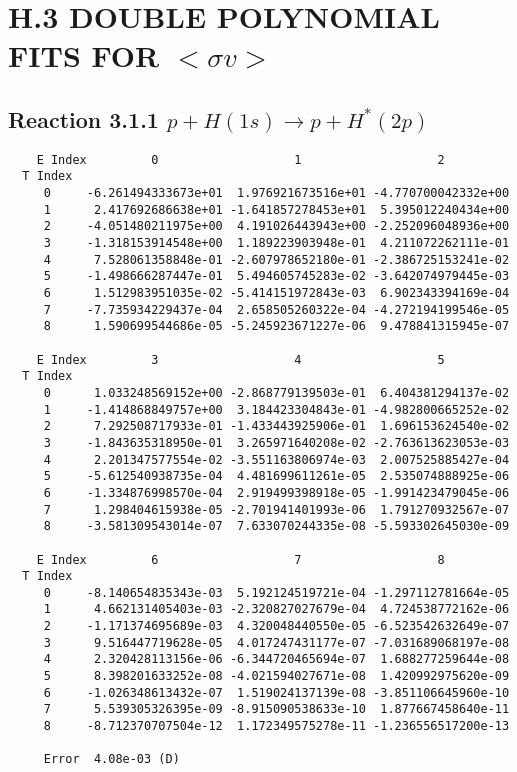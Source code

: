\documentclass[12pt]{article}
\begin{document}
                               

\newpage
\section{
H.3   DOUBLE POLYNOMIAL FITS FOR $<\sigma v>$}

\subsection{
Reaction 3.1.1 $ p + H(1s) \rightarrow p + H^*(2p)$}


\begin{small}\begin{verbatim}
    E Index         0                   1                   2
  T Index
     0     -6.261494333673e+01  1.976921673516e+01 -4.770700042332e+00
     1      2.417692686638e+01 -1.641857278453e+01  5.395012240434e+00
     2     -4.051480211975e+00  4.191026443943e+00 -2.252096048936e+00
     3     -1.318153914548e+00  1.189223903948e-01  4.211072262111e-01
     4      7.528061358848e-01 -2.607978652180e-01 -2.386725153241e-02
     5     -1.498666287447e-01  5.494605745283e-02 -3.642074979445e-03
     6      1.512983951035e-02 -5.414151972843e-03  6.902343394169e-04
     7     -7.735934229437e-04  2.658505260322e-04 -4.272194199546e-05
     8      1.590699544686e-05 -5.245923671227e-06  9.478841315945e-07

    E Index         3                   4                   5
  T Index
     0      1.033248569152e+00 -2.868779139503e-01  6.404381294137e-02
     1     -1.414868849757e+00  3.184423304843e-01 -4.982800665252e-02
     2      7.292508717933e-01 -1.433443925906e-01  1.696153624540e-02
     3     -1.843635318950e-01  3.265971640208e-02 -2.763613623053e-03
     4      2.201347577554e-02 -3.551163806974e-03  2.007525885427e-04
     5     -5.612540938735e-04  4.481699611261e-05  2.535074888925e-06
     6     -1.334876998570e-04  2.919499398918e-05 -1.991423479045e-06
     7      1.298404615938e-05 -2.701941401993e-06  1.791270932567e-07
     8     -3.581309543014e-07  7.633070244335e-08 -5.593302645030e-09

    E Index         6                   7                   8
  T Index
     0     -8.140654835343e-03  5.192124519721e-04 -1.297112781664e-05
     1      4.662131405403e-03 -2.320827027679e-04  4.724538772162e-06
     2     -1.171374695689e-03  4.320048440550e-05 -6.523542632649e-07
     3      9.516447719628e-05  4.017247431177e-07 -7.031689068197e-08
     4      2.320428113156e-06 -6.344720465694e-07  1.688277259644e-08
     5      8.398201633252e-08 -4.021594027671e-08  1.420992975620e-09
     6     -1.026348613432e-07  1.519024137139e-08 -3.851106645960e-10
     7      5.539305326395e-09 -8.915090538633e-10  1.877667458640e-11
     8     -8.712370707504e-12  1.172349575278e-11 -1.236556517200e-13

     Error  4.08e-03 (D)
\end{verbatim}\end{small}
\end{document}
